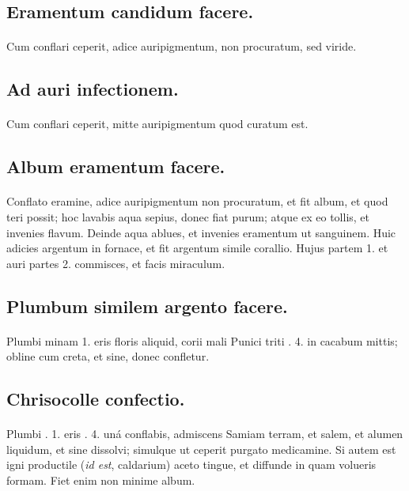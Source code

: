\documentclass[a4paper, 11pt, oneside, polutonikogreek, italian]{article}
\begin{document}
\subsection{Eramentum candidum facere.}
\paragraph{}
Cum conflari ceperit, adice auripigmentum, non procuratum, sed viride.

\subsection{Ad auri infectionem.}
\paragraph{}
Cum conflari ceperit, mitte auripigmentum quod curatum est.

\subsection{Album eramentum facere.}
\paragraph{}
Conflato eramine, adice auripigmentum non procuratum, et fit album, et quod teri possit; hoc lavabis aqua sepius, donec fiat purum; atque ex eo tollis, et invenies flavum. Deinde aqua ablues, et invenies eramentum ut sanguinem. Huic adicies argentum in fornace, et fit argentum simile corallio. Hujus partem 1. et auri partes 2. commisces, et facis miraculum.

\subsection{Plumbum similem argento facere.}
\paragraph{}
Plumbi minam 1. eris floris aliquid, corii mali Punici triti \roundz. 4. in cacabum mittis; obline cum creta, et sine, donec confletur.

\subsection{Chrisocolle confectio.}
\paragraph{}
Plumbi \roundz. 1. eris \roundz. 4. uná conflabis, admiscens Samiam terram, et salem, et alumen liquidum, et sine dissolvi; simulque ut ceperit purgato medicamine. Si autem est igni productile (\emph{id est}, caldarium) aceto tingue, et diffunde in quam volueris formam. Fiet enim non minime album.
\end{document}
